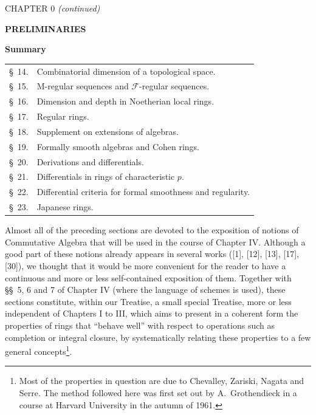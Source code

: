 \clearpage
\thispagestyle{plain}
\label{chapter:0IV1}

\begin{center}
{\large CHAPTER 0 \textit{(continued)}\footnotemark\par}
\vspace{1.5em}
{\Large\bfseries PRELIMINARIES\par}
\vspace{2em}
{\large\bfseries Summary\par}
\end{center}


\begin{center}
\begin{tabular}{@{}r l@{}}
\S~14. & Combinatorial dimension of a topological space.\\
\S~15. & M-regular sequences and $\mathscr F$-regular sequences.\\
\S~16. & Dimension and depth in Noetherian local rings.\\
\S~17. & Regular rings.\\
\S~18. & Supplement on extensions of algebras.\\
\S~19. & Formally smooth algebras and Cohen rings.\\
\S~20. & Derivations and differentials.\\
\S~21. & Differentials in rings of characteristic $p$.\\
\S~22. & Differential criteria for formal smoothness and regularity.\\
\S~23. & Japanese rings.
\end{tabular}
\end{center}

Almost all of the preceding sections are devoted to the exposition of
notions of Commutative Algebra that will be used in the course of Chapter IV.
Although a good part of these notions already appears in several works
([1], [12], [13], [17], [30]), we thought that it would be more convenient for the
reader to have a continuous and more or less self-contained exposition of them.
Together with \S\S~5, 6 and 7 of Chapter IV (where the language of schemes is
used), these sections constitute, within our Treatise, a small special
Treatise, more or less independent of Chapters I to III, which aims to present
in a coherent form the properties of rings that ``behave well''
with respect to operations such as completion or integral
closure, by systematically relating these properties to a few
general concepts\footnote{Most of the properties in question are due to Chevalley, Zariski, Nagata and Serre. The method followed here was first set out by A.~Grothendieck in a course at Harvard University in the autumn of 1961.}.


